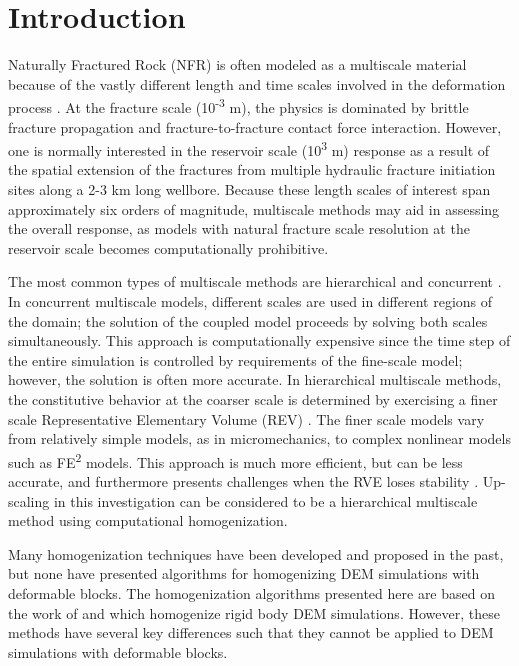 \section{Introduction}
Naturally Fractured Rock (NFR) is often modeled as a multiscale material because of the vastly different length and time scales involved in the deformation process \citep{zhou_flow_2003}. At the fracture scale (10\textsuperscript{-3} m), the physics is dominated by brittle fracture propagation and fracture-to-fracture contact force interaction. However, one is normally interested in the reservoir scale (10\textsuperscript{3} m) response as a result of the spatial extension of the fractures from multiple hydraulic fracture initiation sites along a 2-3 km long wellbore. Because these length scales of interest span approximately six orders of magnitude, multiscale methods may aid in assessing the overall response, as models with natural fracture scale resolution at the reservoir scale becomes computationally prohibitive.

The most common types of multiscale methods are hierarchical and concurrent \citep{Gracie_2011}. In concurrent multiscale models, different scales are used in different regions of the domain; the solution of the coupled model proceeds by solving both scales simultaneously. This approach is computationally expensive since the time step of the entire simulation is controlled by requirements of the fine-scale model; however, the solution is often more accurate.  In hierarchical multiscale methods, the constitutive behavior at the coarser scale is determined by exercising a finer scale Representative Elementary Volume (REV) \citep{Li_2014}. The finer scale models vary from relatively simple models, as in micromechanics, to complex nonlinear models such as FE\textsuperscript{2} models\citep{Feyel_2003}. This approach is much more efficient, but can be less accurate, and furthermore  presents challenges when the RVE loses stability \citep{Belytschko_2008}. Up-scaling in this investigation can be considered to be a hierarchical multiscale method using computational homogenization. 

Many homogenization techniques have been developed and proposed in the past, but none have presented algorithms for homogenizing DEM simulations with deformable blocks. The homogenization algorithms presented here are based on the work of \citet{daddetta_particle_2004} and \citet{wellmann_homogenization_2008} which homogenize rigid body DEM simulations. However, these methods have several key differences such that they cannot be applied to DEM simulations with deformable blocks.

